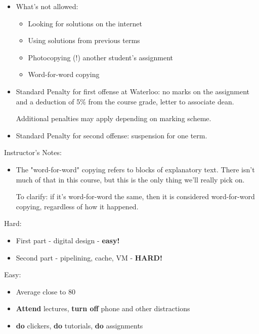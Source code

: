 \begin{frame}[fragile]
\begin{itemize}
\item What's not allowed:
\begin{itemize}
	\item Looking for solutions on the internet
	\item Using solutions from previous terms
	\item Photocopying (!) another student's assignment
	\item Word-for-word copying
\end{itemize}
\item Standard Penalty for first offense at Waterloo: 
	no marks on the assignment and a deduction of 5\% from the course 
	grade, letter to associate dean.

	Additional penalties may apply depending on marking scheme.
\item Standard Penalty for second offense: suspension for one term.
\end{itemize}
\BNotes\ifnum{}
Instructor's Notes:
\begin{itemize}
	\item The "word-for-word" copying refers to blocks of explanatory
		text.  There isn't much of that in this course, but this
		is the only thing we'll really pick on.

		To clarify: if it's word-for-word the same, then it is
		considered word-for-word copying, regardless of how it
		happened.
\end{itemize}
\fi\ENotes
\end{frame}

\begin{frame}[fragile]
  Hard:
  \begin{itemize}
  \item First part - digital design - \textbf{easy!}
\item     Second part - pipelining, cache, VM - \textbf{ HARD!}

  \end{itemize}
  Easy:
  \begin{itemize}
  \item Average close to 80
\item     \textbf{Attend} lectures, \textbf{turn off} phone and other distractions 
\item \textbf{do} clickers, \textbf{do} tutorials, \textbf{do} assignments
  \end{itemize}
\end{frame}

